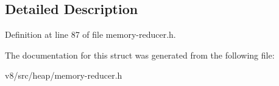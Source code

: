 \subsection{Detailed Description}


Definition at line 87 of file memory-\/reducer.\+h.



The documentation for this struct was generated from the following file\+:\begin{DoxyCompactItemize}
\item 
v8/src/heap/memory-\/reducer.\+h\end{DoxyCompactItemize}
